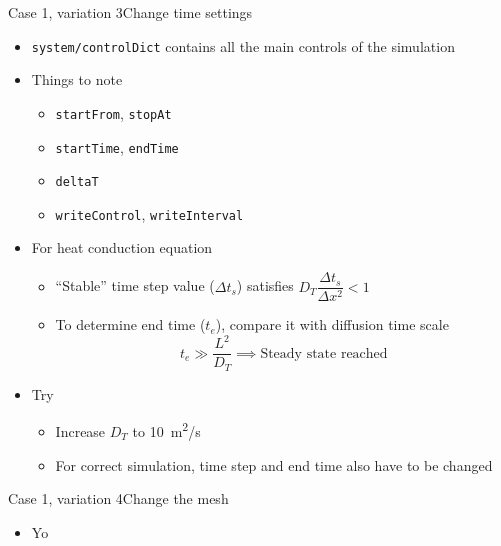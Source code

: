 \begin{frame}{Case 1, variation 3}{Change time settings}
    \begin{itemize}
        \setitemsep{1em}
        \item \texttt{system/controlDict} contains all the main controls of the simulation
        \item Things to note
        \begin{itemize}
            \item \texttt{startFrom}, \texttt{stopAt}
            \item \texttt{startTime}, \texttt{endTime}
            \item \texttt{deltaT}
            \item \texttt{writeControl}, \texttt{writeInterval}
        \end{itemize}
        \item For heat conduction equation
        \begin{itemize}
            \item ``Stable'' time step value ($\Delta t_s$) satisfies $D_T \dfrac{\Delta t_s}{\Delta x^2} < 1$
            \item To determine end time ($t_e$), compare it with diffusion time scale
            \begin{equation*}
                t_e \gg \frac{L^2}{D_T} \implies \text{Steady state reached}
            \end{equation*}
        \end{itemize}
        \item Try
        \begin{itemize}
            \item Increase $D_T$ to \qty{10}{m^2/s}
            \item For correct simulation, time step and end time also have to be changed
        \end{itemize}
    \end{itemize}
\end{frame}

\begin{frame}{Case 1, variation 4}{Change the mesh}
    \begin{itemize}
        \item Yo
    \end{itemize}
\end{frame}

